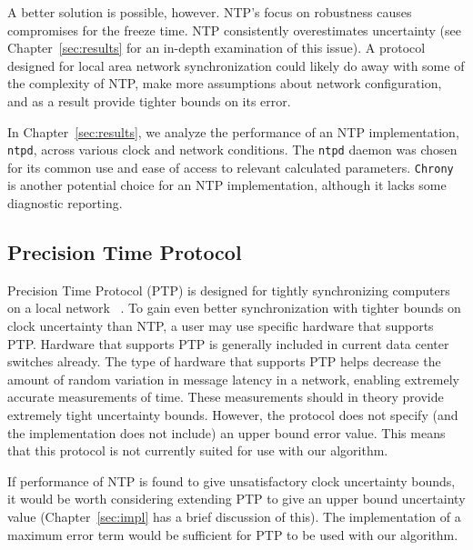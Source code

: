 A better solution is possible, however. NTP's focus on robustness
causes compromises for the freeze time. NTP consistently overestimates
uncertainty (see Chapter~\ref{sec:results} for an in-depth examination
of this issue). A protocol designed for local area network
synchronization could likely do away with some of the complexity of
NTP, make more assumptions about network configuration, and as a
result provide tighter bounds on its error.

In Chapter~\ref{sec:results}, we analyze the performance of an NTP
implementation, \texttt{ntpd}, across various clock and network
conditions. The \texttt{ntpd} daemon was chosen for its common use and
ease of access to relevant calculated parameters. \texttt{Chrony} is
another potential choice for an NTP implementation, although it lacks
some diagnostic
reporting. %

\subsection{Precision Time Protocol}

Precision Time Protocol (PTP) is designed for tightly synchronizing
computers on a local network ~\citeyearpar{2008}. To gain even better
synchronization with tighter bounds on clock uncertainty than NTP, a
user may use specific hardware that supports PTP. Hardware that
supports PTP is generally included in current data center switches
already. The type of hardware that supports PTP helps decrease the
amount of random variation in message latency in a network, enabling
extremely accurate measurements of time.  These measurements should in
theory provide extremely tight uncertainty bounds. However, the
protocol does not specify (and the implementation does not include) an
upper bound error value. This means that this protocol is not
currently suited for use with our algorithm.

If performance of NTP is found to give unsatisfactory clock
uncertainty bounds, it would be worth considering extending PTP to
give an upper bound uncertainty value (Chapter~\ref{sec:impl} has a
brief discussion of this). The implementation of a maximum error term
would be sufficient for PTP to be used with our algorithm.


